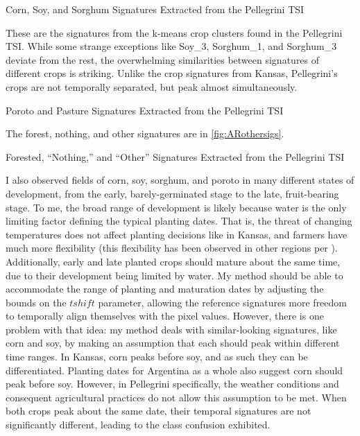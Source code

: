\begin{ssfigure}
  \centering
  
  \caption{Corn, Soy, and Sorghum Signatures Extracted from the Pellegrini TSI}
  \medskip
  \small
  These are the signatures from the k-means crop clusters found in the Pellegrini TSI. While some strange exceptions like Soy\_3, Sorghum\_1, and Sorghum\_3 deviate from the rest, the overwhelming similarities between signatures of different crops is striking. Unlike the crop signatures from Kansas, Pellegrini's crops are not temporally separated, but peak almost simultaneously.
  \label{fig:ARcropsigs}
\end{ssfigure}

\begin{ssfigure}
  \centering
  
  \caption{Poroto and Pasture Signatures Extracted from the Pellegrini TSI}
  \label{fig:ARporotopasturesigs}
\end{ssfigure}
The forest, nothing, and other signatures are in \autoref{fig:ARothersigs}.

\begin{ssfigure}
  \centering
  
  \caption{Forested, ``Nothing,'' and ``Other'' Signatures Extracted from the Pellegrini TSI}
  \label{fig:ARothersigs}
\end{ssfigure}

I also observed fields of corn, soy, sorghum, and poroto in many different states of development, from the early, barely-germinated stage to the late, fruit-bearing stage. To me, the broad range of development is likely because water is the only limiting factor defining the typical planting dates. That is, the threat of changing temperatures does not affect planting decisions like in Kansas, and farmers have much more flexibility (this flexibility has been observed in other regions per \textcite{sacks2010crop}). Additionally, early and late planted crops should mature about the same time, due to their development being limited by water. My method should be able to accommodate the range of planting and maturation dates by adjusting the bounds on the $tshift$ parameter, allowing the reference signatures more freedom to temporally align themselves with the pixel values. However, there is one problem with that idea: my method deals with similar-looking signatures, like corn and soy, by making an assumption that each should peak within different time ranges. In Kansas, corn peaks before soy, and as such they can be differentiated. Planting dates for Argentina as a whole also suggest corn should peak before soy. However, in Pellegrini specifically, the weather conditions and consequent agricultural practices do not allow this assumption to be met. When both crops peak about the same date, their temporal signatures are not significantly different, leading to the class confusion exhibited.

